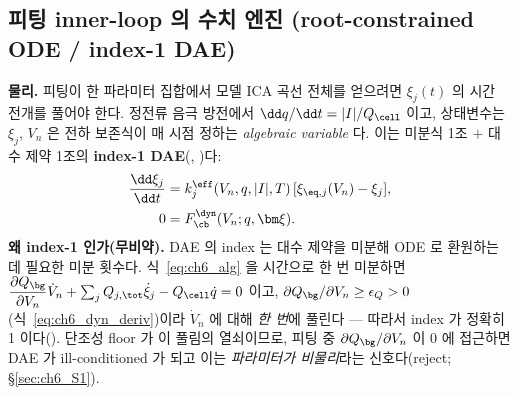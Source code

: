\subsection{피팅 inner-loop 의 수치 엔진 (root-constrained ODE / index-1 DAE)}\label{sec:ch6_dae}
\textbf{물리.} 피팅이 한 파라미터 집합에서 모델 ICA 곡선 전체를 얻으려면 $\xi_j(t)$ 의 시간 전개를 풀어야 한다.
정전류 음극 방전에서 $\dd q/\dd t=|I|/Q_\cell$ 이고, 상태변수는 $\xi_j$, $V_n$ 은 전하 보존식이 매 시점 정하는
\emph{algebraic variable} 다. 이는 미분식 1조 $+$ 대수 제약 1조의 \textbf{index-1 DAE}(,
\cite{brenan1996,hindmarsh2005})다:
\begin{align}
\frac{\dd\xi_j}{\dd t}&=k_j^{\eff}(V_n,q,|I|,T)\,[\xi_{\eq,j}(V_n)-\xi_j],\label{eq:ch6_ode}\\
0&=F_\cb^\dyn(V_n;q,\bm\xi).\label{eq:ch6_alg}
\end{align}
\textbf{왜 index-1 인가(무비약).} DAE 의 index 는 대수 제약을 미분해 ODE 로 환원하는 데 필요한 미분 횟수다.
식~\eqref{eq:ch6_alg} 을 시간으로 한 번 미분하면 $\dfrac{\partial Q_\bg}{\partial V_n}\dot V_n+\sum_j Q_{j,\tot}
\dot\xi_j-Q_\cell\dot q=0$ 이고, $\partial Q_\bg/\partial V_n\ge\epsilon_Q>0$(식~\eqref{eq:ch6_dyn_deriv})이라
$\dot V_n$ 에 대해 \emph{한 번}에 풀린다 — 따라서 index 가 정확히 1 이다(). 단조성 floor 가 이 풀림의
열쇠이므로, 피팅 중 $\partial Q_\bg/\partial V_n$ 이 0 에 접근하면 DAE 가 ill-conditioned 가 되고 이는
\emph{파라미터가 비물리}라는 신호다(reject; \S\ref{sec:ch6_S1}).

